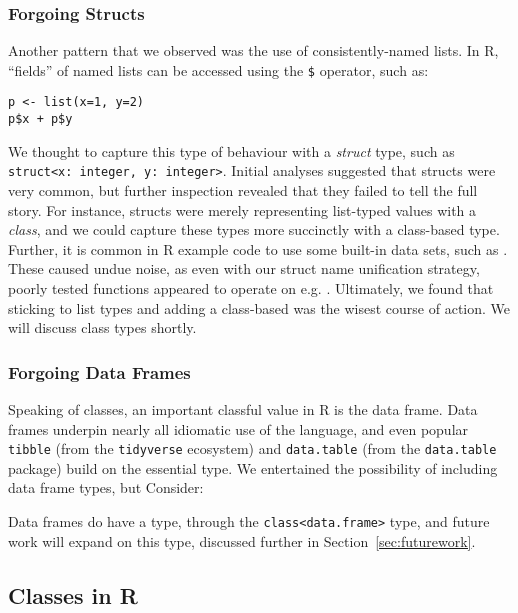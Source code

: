 \documentclass[acmsmall,review,anonymous]{acmart}\settopmatter{printfolios=true,printccs=false,printacmref=false}
\newcommand{\code}[1]{{\lstinline[style=Rin]!#1!}\xspace}
\begin{document}
%
%
\subsubsection{Forgoing Structs}

Another pattern that we observed was the use of consistently-named lists.
In R, ``fields'' of named lists can be accessed using the \code{$} operator, such as:
\begin{lstlisting}
p <- list(x=1, y=2)
p$x + p$y
\end{lstlisting}
We thought to capture this type of behaviour with a {\it struct} type, such as \code{struct<x: integer, y: integer>}.
Initial analyses suggested that structs were very common, but further inspection revealed that they failed to tell the full story.
For instance,  structs were merely representing list-typed values with a {\it class}, and we could capture these types more succinctly with a class-based type.
Further, it is common in R example code to use some built-in data sets, such as .
These caused undue noise, as even with our struct name unification strategy, poorly tested functions appeared to operate on e.g. .
Ultimately, we found that sticking to list types and adding a class-based was the wisest course of action.
We will discuss class types shortly.

%
%
\subsubsection{Forgoing Data Frames}

Speaking of classes, an important classful value in R is the data frame.
Data frames underpin nearly all idiomatic use of the language, and even popular \code{tibble} (from the \code{tidyverse} ecosystem) and \code{data.table} (from the \code{data.table} package) build on the essential type.
We entertained the possibility of including data frame types, but 
Consider: 

Data frames do have a type, through the \code{class<data.frame>} type, and future work will expand on this type, discussed further in Section~\ref{sec:futurework}.

%
%
%
%
\subsection{Classes in R}
\end{document}
